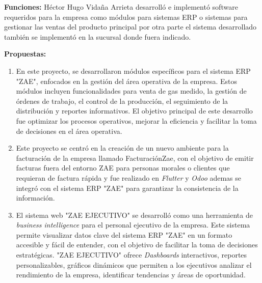 \documentclass[protocolo.tex]{subfiles}
\begin{document}
\textbf{Funciones:}
Héctor Hugo Vidaña Arrieta desarrolló e implementó software requeridos para la empresa como módulos para
sistemas ERP o sistemas para gestionar las ventas del producto principal por otra parte el
sistema desarrollado también se implementó en la sucursal donde fuera indicado.\vspace{5mm}

\textbf{Propuestas:}
\begin{enumerate}
\item En este proyecto,  se  desarrollaron  módulos  específicos  para  el  sistema  ERP  "ZAE",  enfocados  en  la  gestión  del  área  operativa  de  la  empresa.  Estos  módulos  incluyen  funcionalidades  para  venta de gas medido, la gestión de órdenes de trabajo, el control de la producción, el seguimiento de la distribución y reportes informativos.  El  objetivo  principal  de  este  desarrollo  fue  optimizar  los  procesos  operativos,  mejorar  la  eficiencia  y  facilitar  la  toma  de  decisiones  en  el  área  operativa.

\item Este proyecto se centró en la creación de un nuevo ambiente para la facturación de la empresa llamado FacturaciónZae,  con el objetivo de emitir facturas fuera del entorno ZAE para personas morales o clientes que requieran de factura rápida y fue realizado en \textit{Flutter} y \textit{Odoo} ademas  se  integró  con  el  sistema  ERP  "ZAE"  para  garantizar  la  consistencia  de  la  información.

\item El sistema web "ZAE EJECUTIVO" se  desarrolló  como  una  herramienta  de  \textit{business intelligence}  para  el  personal  ejecutivo  de  la  empresa.  Este  sistema  permite  visualizar  datos  clave  del  sistema  ERP  "ZAE"  en  un  formato  accesible  y  fácil  de  entender,  con  el  objetivo  de  facilitar  la  toma  de  decisiones  estratégicas.  "ZAE  EJECUTIVO"  ofrece \textit{Dashboards} interactivos, reportes personalizables, gráficos dinámicos que  permiten  a  los  ejecutivos  analizar  el  rendimiento  de  la  empresa,  identificar  tendencias  y  áreas  de  oportunidad.


\end{enumerate}
\end{document}
